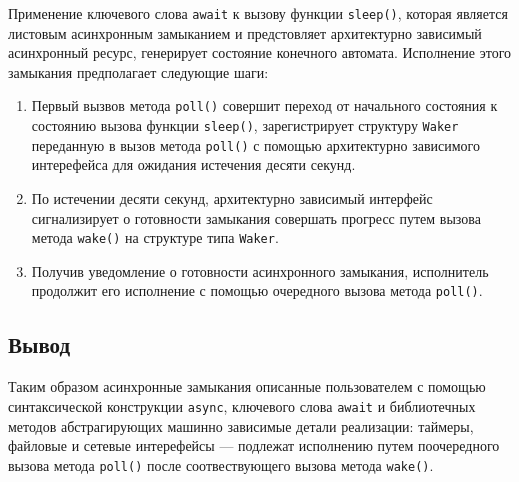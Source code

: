 Применение ключевого слова \verb|await| к вызову функции \verb|sleep()|, которая является листовым асинхронным замыканием и предстовляет архитектурно зависимый асинхронный ресурс, генерирует состояние конечного автомата. Исполнение этого замыкания предполагает следующие шаги:

\begin{enumerate}
    \item Первый вызвов метода \verb|poll()| совершит переход от начального состояния к состоянию вызова функции \verb|sleep()|, зарегистрирует структуру \verb|Waker| переданную в вызов метода \verb|poll()| с помощью архитектурно зависимого интерефейса для ожидания истечения десяти секунд.
    \item По истечении десяти секунд, архитектурно зависимый интерфейс сигнализирует о готовности замыкания совершать прогресс путем вызова метода \verb|wake()| на структуре типа \verb|Waker|.
    \item Получив уведомление о готовности асинхронного замыкания, исполнитель продолжит его исполнение с помощью очередного вызова метода \verb|poll()|.
\end{enumerate}

\subsection{Вывод}

Таким образом асинхронные замыкания описанные пользователем с помощью синтаксической конструкции \verb|async|, ключевого слова \verb|await| и библиотечных методов абстрагирующих машинно зависимые детали реализации: таймеры, файловые и сетевые интерефейсы --- подлежат исполнению путем поочередного вызова метода \verb|poll()| после соотвествующего вызова метода \verb|wake()|.
